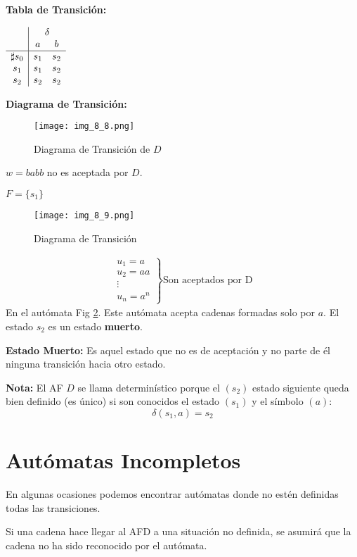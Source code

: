 \textbf{Tabla de Transición: }

\begin{center}
$\begin{array}{c|cc}
	&\multicolumn{2}{c}{\delta}	\\
	&a	&b	\\ \hline
\sharp s_0	&s_1&s_2	\\
s_1	&s_1&s_2	\\
s_2	&s_2&s_2
\end{array}$
\end{center}

\textbf{Diagrama de Transición: }

\begin{figure}[h!]
\centering
\texttt{[image: img\_8\_8.png]}
\caption{Diagrama de Transición de $D$}\label{img_8_8}
\end{figure}

$w=babb$ no es aceptada por $D$.

$F=\{s_1\}$
\begin{figure}[h!]
\centering
\texttt{[image: img\_8\_9.png]}
\caption{Diagrama de Transición}\label{img_8_9}
\end{figure}
\begin{align*}
\left. \begin{array}{c}
	u_1	=a	\\
	u_2	=aa	\\
	\vdots	\\
	u_n	=a^n
	\end{array}\right \} \mbox{Son aceptados por D}
\end{align*}
En el autómata Fig \ref{img_8_9}. Este autómata acepta cadenas formadas solo por $a$. El estado  $s_2$ es un estado \textbf{muerto}.

\textbf{Estado Muerto: }Es aquel estado que no es de aceptación y no parte de él ninguna transición hacia otro estado.

\textbf{Nota: }El AF $D$ se llama determinístico porque el $(s_2)$ estado siguiente queda bien definido (es único) si son conocidos el estado $(s_1)$ y el símbolo $(a)$:
$$\delta(s_1,a) = s_2$$

\section{Autómatas Incompletos}
En algunas ocasiones podemos encontrar autómatas donde no estén definidas todas las transiciones.

Si una cadena hace llegar al AFD a una situación no definida, se asumirá que la cadena no ha sido reconocido por el autómata.
